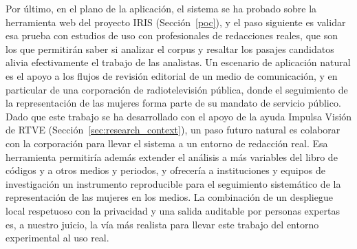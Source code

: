 Por último, en el plano de la aplicación, el sistema se ha probado sobre la
herramienta web del proyecto IRIS (Sección~\ref{poc}), y el paso siguiente es validar
esa prueba con estudios de uso con profesionales de redacciones reales, que son
los que permitirán saber si analizar el corpus y resaltar los pasajes candidatos alivia
efectivamente el trabajo de las analistas. Un
escenario de aplicación natural es el apoyo a los flujos de revisión editorial de un
medio de comunicación, y en particular de una corporación de radiotelevisión pública,
donde el seguimiento de la representación de las mujeres forma parte de su mandato de
servicio público. Dado que este trabajo se ha desarrollado con el apoyo de la ayuda
Impulsa Visión de RTVE (Sección~\ref{sec:research_context}), un paso futuro natural es
colaborar con la corporación para llevar el sistema a un entorno de redacción real. Esa
herramienta permitiría además extender el análisis a más variables del libro de códigos
y a otros medios y periodos, y ofrecería a instituciones y equipos de investigación un
instrumento reproducible para el seguimiento sistemático de la representación de las
mujeres en los medios. La combinación de un despliegue local respetuoso con la privacidad
y una salida auditable por personas expertas es, a nuestro juicio, la vía más realista
para llevar este trabajo del entorno experimental al uso real.
